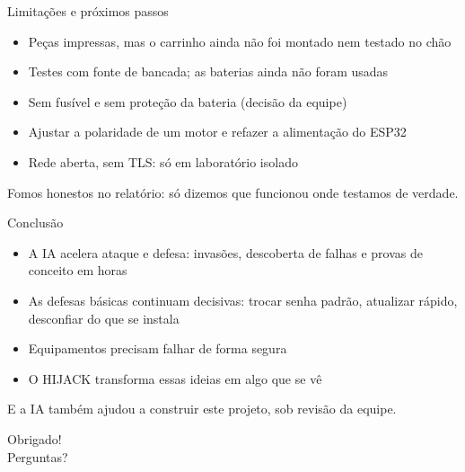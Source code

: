 \documentclass[aspectratio=169,10pt]{beamer}
\newcommand{\ideia}[1]{\par\vfill\noindent\colorbox{verde!12}{\parbox{\dimexpr\linewidth-2\fboxsep\relax}{\small\strut #1\strut}}}
\begin{document}
\begin{frame}{Limitações e próximos passos}
\begin{itemize}
  \item Peças impressas, mas o carrinho ainda não foi montado nem testado no chão
  \item Testes com fonte de bancada; as baterias ainda não foram usadas
  \item Sem fusível e sem proteção da bateria (decisão da equipe)
  \item Ajustar a polaridade de um motor e refazer a alimentação do ESP32
  \item Rede aberta, sem TLS: só em laboratório isolado
\end{itemize}
\ideia{Fomos honestos no relatório: só dizemos que funcionou onde testamos de verdade.}
\end{frame}

\begin{frame}{Conclusão}
\begin{itemize}
  \item A IA acelera ataque e defesa: invasões, descoberta de falhas e provas de conceito em horas
  \item As defesas básicas continuam decisivas: trocar senha padrão, atualizar rápido, desconfiar do que se instala
  \item Equipamentos precisam falhar de forma segura
  \item O HIJACK transforma essas ideias em algo que se vê
\end{itemize}
\ideia{E a IA também ajudou a construir este projeto, sob revisão da equipe.}
\end{frame}

\begin{frame}[standout]
Obrigado!\\[0.5em]
\normalsize Perguntas?
\end{frame}
\end{document}
